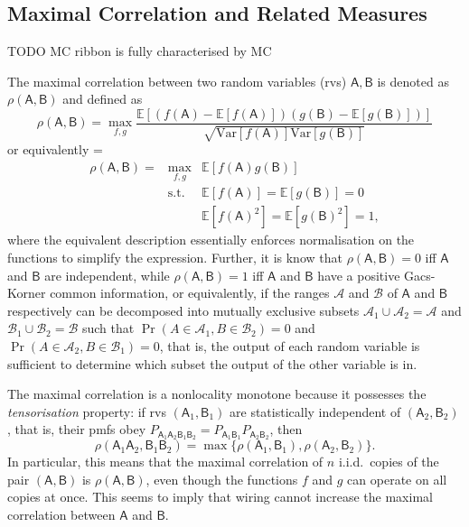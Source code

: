 \documentclass[10pt, a4paper]{article}
\numberwithin{equation}{section} %
\theoremstyle{definition}
\theoremstyle{plain}
\newenvironment{Array}[1] %
{\def\arraystretch{1.75}\everymath={\displaystyle}\begin{equation}\begin{array}{#1}}
{\end{array}\end{equation}}
\newcommand{\?}{\mathrel{?}} %
\newcommand{\E}{\mathbb{E}} %
\newcommand{\Var}{\mathrm{Var}} %
\newcommand{\sA}{\mathcal{A}}
\newcommand{\sB}{\mathcal{B}}
\newcommand{\crv}[1]{\mathsf{#1}}
\begin{document}
    \subsection{Maximal Correlation and Related Measures}\label{sec:nlmono_maxcorr}

    TODO MC ribbon is fully characterised by MC

    The maximal correlation between two random variables (rvs) \(\crv{A},\crv{B}\) is denoted as \(\rho(\crv{A},\crv{B})\) and defined as~\cite{NLMonotones}
    \begin{equation}
      \rho(\crv{A},\crv{B}) = \max_{f,g} \frac{\E[(f(\crv{A})-\E[f(\crv{A})])(g(\crv{B})-\E[g(\crv{B})])]}{\sqrt{\Var[f(\crv{A})]\Var[g(\crv{B})]}}
    \end{equation}
    or equivalently
    \begin{Array}{rcl}
      \rho(\crv{A},\crv{B}) = & \max_{f,g}  & \E[f(\crv{A})g(\crv{B})] \\
                  & \text{s.t.} & \E[f(\crv{A})] = \E[g(\crv{B})] = 0 \\
                  &             & \E[f(\crv{A})^2] = \E[g(\crv{B})^2] = 1,
    \end{Array}
    where the equivalent description essentially enforces normalisation on the functions to simplify the expression. Further, it is know that \(\rho(\crv{A},\crv{B}) = 0\) iff \(\crv{A}\) and \(\crv{B}\) are independent, while \(\rho(\crv{A},\crv{B}) = 1\) iff \(\crv{A}\) and \(\crv{B}\) have a positive Gacs-Korner common information, or equivalently, if the ranges \(\sA\) and \(\sB\) of \(\crv{A}\) and \(\crv{B}\) respectively can be decomposed into mutually exclusive subsets \(\sA_1 \cup \sA_2 = \sA\) and \(\sB_1 \cup \sB_2 = \sB\) such that \(\Pr(A \in \sA_1, B \in \sB_2) = 0\) and \(\Pr(A \in \sA_2, B \in \sB_1) = 0\), that is, the output of each random variable is sufficient to determine which subset the output of the other variable is in.

    The maximal correlation is a nonlocality monotone because it possesses the \emph{tensorisation} property: if rvs \((\crv{A}_1, \crv{B}_1)\) are statistically independent of \((\crv{A}_2,\crv{B}_2)\), that is, their pmfs obey \(P_{\crv{A}_1\crv{A}_2\crv{B}_1\crv{B}_2} = P_{\crv{A}_1\crv{B}_1}P_{\crv{A}_2\crv{B}_2}\), then
    \begin{equation}
      \rho(\crv{A}_1\crv{A}_2,\crv{B}_1\crv{B}_2) = \max\{ \rho(\crv{A}_1,\crv{B}_1), \rho(\crv{A}_2,\crv{B}_2) \}.
    \end{equation}
    In particular, this means that the maximal correlation of \(n\) i.i.d.\ copies of the pair \((\crv{A},\crv{B})\) is \(\rho(\crv{A},\crv{B})\), even though the functions \(f\) and \(g\) can operate on all copies at once. This seems to imply that wiring cannot increase the maximal correlation between \(\crv{A}\) and \(\crv{B}\).
\end{document}
